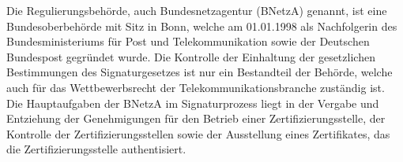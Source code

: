 Die Regulierungsbehörde, auch Bundesnetzagentur (BNetzA) genannt, ist eine Bundesoberbehörde mit Sitz in Bonn, welche am 01.01.1998 als Nachfolgerin des Bundesministeriums für Post und Telekommunikation sowie der Deutschen Bundespost gegründet wurde. Die Kontrolle der Einhaltung der gesetzlichen Bestimmungen des Signaturgesetzes ist nur ein Bestandteil der Behörde, welche auch für das Wettbewerbsrecht der Telekommunikationsbranche zuständig ist. Die Hauptaufgaben der BNetzA im Signaturprozess liegt in der Vergabe und Entziehung der Genehmigungen für den Betrieb einer Zertifizierungsstelle, der Kontrolle der Zertifizierungsstellen sowie der Ausstellung eines Zertifikates, das die Zertifizierungsstelle authentisiert. \cite{regBeh1}\cite{standdeswissens3}
